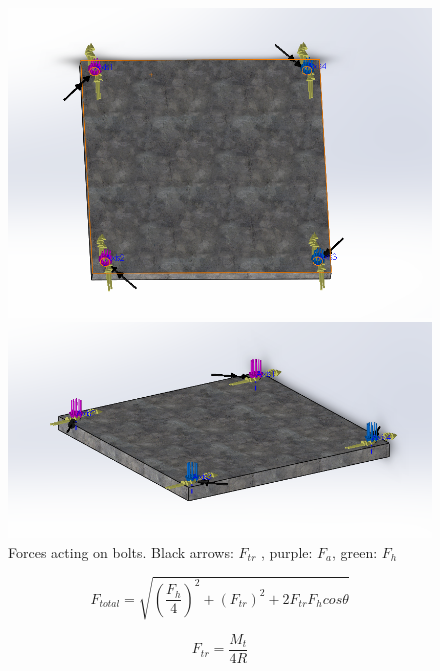 \begin{figure}[H]
	\begin{minipage}{0.5\textwidth}	
		\includegraphics[scale=0.35]{CombinedForces1}
	\end{minipage} \hfill
	\begin{minipage}{0.6\textwidth}
		\includegraphics[scale=0.5]{CombinedForces2}
	\end{minipage}
	\begin{center}
		\caption{Forces acting on bolts. Black arrows: $F_{tr}$ , purple: $F_{a}$, green: $F_{h}$ }
	\end{center}
\end{figure}

\begin{equation}
F_{total} = \sqrt{(\frac{F_{h}}{4})^{2} + (F_{tr})^{2} + 2 F_{tr} F_{h} cos \theta}
\end{equation}

\begin{equation}
F_{tr} = \frac{M_{t}}{4 R}
\end{equation}

